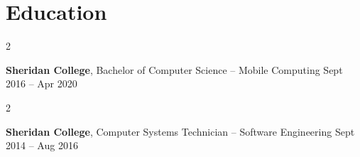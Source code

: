 \documentclass[11pt, letterpaper]{article}
\newenvironment{twocolentry}[2][]{
\onecolentry
\def\secondColumn{#2}
\setcolumnwidth{\fill, 4.5 cm}
\begin{paracol}{2}
}{
\switchcolumn \raggedleft \secondColumn
\end{paracol}
\endonecolentry
} %
\begin{document}
\section{Education}

\begin{twocolentry}{Sept 2016 – Apr 2020}
\textbf{Sheridan College}, Bachelor of Computer Science – Mobile Computing \end{twocolentry}

\vspace{0.10 cm}

\begin{twocolentry}{Sept 2014 – Aug 2016}
\textbf{Sheridan College}, Computer Systems Technician – Software Engineering\end{twocolentry}

\vspace{0.10 cm}
\end{document}
